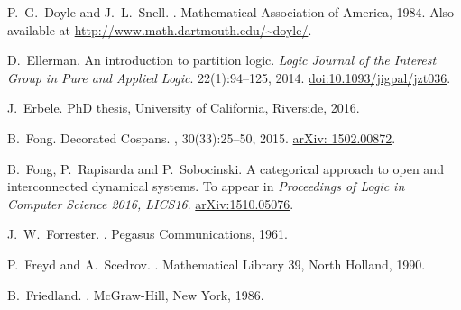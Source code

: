 \begin{thebibliography}{RSW00}
    P.\ G.\ Doyle and J.\ L.\ Snell.
    . Mathematical Association of America, 1984.
    \newblock Also available at \href{http://www.math.dartmouth.edu/~doyle/}
    {http://www.math.dartmouth.edu/\~{}doyle/}.


  D.\ Ellerman.
  \newblock An introduction to partition logic.
  \newblock \textsl{Logic Journal of the Interest Group in Pure and Applied
  Logic}. { 22}(1):94--125, 2014.
  \newblock
  \href{http://doi.org/10.1093/jigpal/jzt036}{doi:10.1093/jigpal/jzt036}.
    
    J.\ Erbele.
    \newblock PhD thesis, University of California, Riverside, 2016. 

    B.\ Fong.
    \newblock Decorated Cospans.
    , 30(33):25--50, 2015.
    \newblock \href{http://arxiv.org/abs/1502.00872}{arXiv: 1502.00872}.

    B.\ Fong, P.\ Rapisarda and P.\ Sobocinski.
    \newblock A categorical approach to open and interconnected dynamical
    systems.
    \newblock To appear in {\sl Proceedings of Logic in Computer Science 2016,
    LICS16}.
    \newblock \href{http://arxiv.org/abs/1510.05076}{arXiv:1510.05076}.

    J.\ W.\ Forrester.
    . Pegasus Communications, 1961. 
    
    P.\ Freyd and A.\ Scedrov.
    . Mathematical Library 39, North
    Holland, 1990.

    B.\ Friedland. 
    . McGraw-Hill, New York, 1986.


\end{thebibliography}
